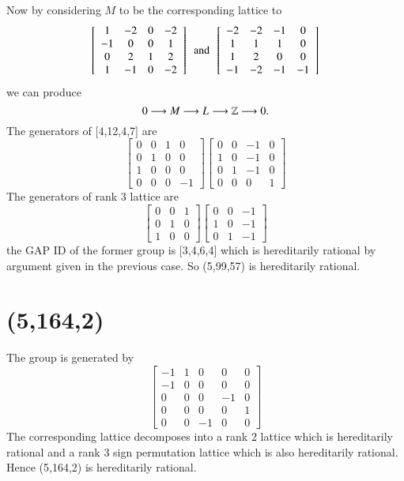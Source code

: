 Now by considering $M$ to be the corresponding lattice to 
$$
\left[ \begin {array}{cccc} 1&-2&0&-2\\-1&0&0&1
\\0&2&1&2\\1&-1&0&-2\end {array}
 \right] 
 \,\,\, \text{and} \,\,\,
 \left[ \begin {array}{cccc} -2&-2&-1&0\\1&1&1&0
\\1&2&0&0\\-1&-2&-1&-1
\end {array} \right] 
$$
we can produce
$$
0 \longrightarrow M_{} \longrightarrow L_{} \longrightarrow \mathbb{Z} \longrightarrow 0
.$$
The generators of [4,12,4,7] are 
$$
 \left[ \begin {array}{ccc|c} 0&0&1&0\\ 0&1&0&0
\\ 1&0&0&0\\ \hline 0&0&0&-1\end {array}
 \right] 
 \left[ \begin {array}{ccc|c} 0&0&-1&0\\ 1&0&-1&0
\\ 0&1&-1&0\\ \hline 0&0&0&1\end {array}
 \right] 
$$
The generators of rank 3 lattice are 
$$
 \left[ \begin {array}{ccc} 0&0&1\\ 0&1&0
\\ 1&0&0\end {array} \right] 
 \left[ \begin {array}{ccc} 0&0&-1\\ 1&0&-1
\\ 0&1&-1\end {array} \right]
$$
the GAP ID of the former group is [3,4,6,4] which is hereditarily rational by argument given in the previous case. So (5,99,57) is hereditarily rational.
  \section{(5,164,2)}
The group is generated by 
$$
 \left[ \begin {array}{cc|ccc} -1&1&0&0&0\\-1&0&0&0&0
\\ \hline 0&0&0&-1&0\\0&0&0&0&1
\\0&0&-1&0&0\end {array} \right] 
$$
The corresponding lattice decomposes into a rank 2 lattice which is hereditarily rational and a rank 3 sign permutation lattice which is also hereditarily rational. Hence (5,164,2) is hereditarily rational.
